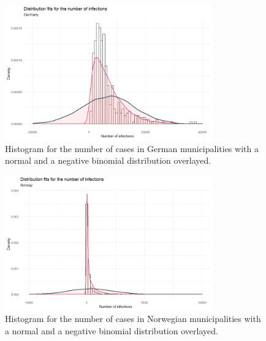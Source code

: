 \begin{figure}[H]
    \centering
    \includegraphics[width = 0.8\textwidth]{distrfit_germany.png}    
    \caption{Histogram for the number of cases in German municipalities with a normal and a negative binomial distribution overlayed.}
    \label{fitDistrGermany}
\end{figure}
%         
\begin{figure}[H]
    \centering
    \includegraphics[width = 0.8\textwidth]{distrfit_norway.png}
    \caption{Histogram for the number of cases in Norwegian municipalities with a normal and a negative binomial distribution overlayed.}
    \label{fitDistrNorway}
\end{figure}
\clearpage
